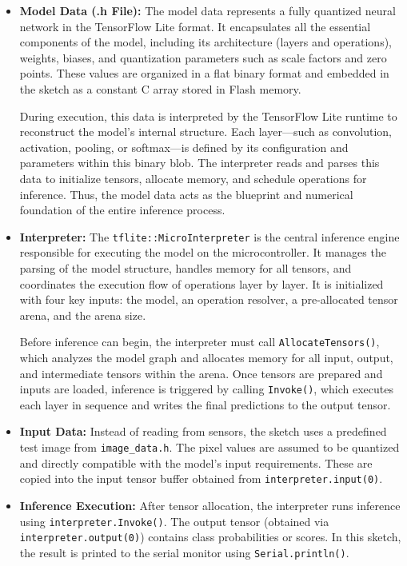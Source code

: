 \begin{itemize}
    \item \textbf{Model Data (.h File):} 
    The model data represents a fully quantized neural network in the TensorFlow Lite format. It encapsulates all the essential components of the model, including its architecture (layers and operations), weights, biases, and quantization parameters such as scale factors and zero points. These values are organized in a flat binary format and embedded in the sketch as a constant C array stored in Flash memory.
    
    During execution, this data is interpreted by the TensorFlow Lite runtime to reconstruct the model's internal structure. Each layer—such as convolution, activation, pooling, or softmax—is defined by its configuration and parameters within this binary blob. The interpreter reads and parses this data to initialize tensors, allocate memory, and schedule operations for inference. Thus, the model data acts as the blueprint and numerical foundation of the entire inference process.

    \item \textbf{Interpreter:} 
    The \texttt{tflite::MicroInterpreter} is the central inference engine responsible for executing the model on the microcontroller. It manages the parsing of the model structure, handles memory for all tensors, and coordinates the execution flow of operations layer by layer. It is initialized with four key inputs: the model, an operation resolver, a pre-allocated tensor arena, and the arena size.
    
    Before inference can begin, the interpreter must call \texttt{AllocateTensors()}, which analyzes the model graph and allocates memory for all input, output, and intermediate tensors within the arena. Once tensors are prepared and inputs are loaded, inference is triggered by calling \texttt{Invoke()}, which executes each layer in sequence and writes the final predictions to the output tensor.
    

    \item \textbf{Input Data:} 
    Instead of reading from sensors, the sketch uses a predefined test image from \texttt{image\_data.h}. The pixel values are assumed to be quantized and directly compatible with the model's input requirements. These are copied into the input tensor buffer obtained from \texttt{interpreter.input(0)}.

    \item \textbf{Inference Execution:} 
    After tensor allocation, the interpreter runs inference using \texttt{interpreter.Invoke()}. The output tensor (obtained via \texttt{interpreter.output(0)}) contains class probabilities or scores. In this sketch, the result is printed to the serial monitor using \texttt{Serial.println()}.
\end{itemize}

